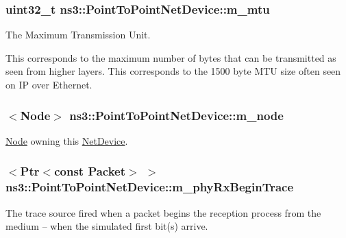 \subsubsection[{\texorpdfstring{m\+\_\+mtu}{m_mtu}}]{\setlength{\rightskip}{0pt plus 5cm}uint32\+\_\+t ns3\+::\+Point\+To\+Point\+Net\+Device\+::m\+\_\+mtu\hspace{0.3cm}{\ttfamily [private]}}\hypertarget{classns3_1_1PointToPointNetDevice_ae13b9dafe4a3bba937f53135df4f68ce}{}\label{classns3_1_1PointToPointNetDevice_ae13b9dafe4a3bba937f53135df4f68ce}


The Maximum Transmission Unit. 

This corresponds to the maximum number of bytes that can be transmitted as seen from higher layers. This corresponds to the 1500 byte M\+TU size often seen on IP over Ethernet. 
\subsubsection[{\texorpdfstring{m\+\_\+node}{m_node}}]{$<${\bf Node}$>$ ns3\+::\+Point\+To\+Point\+Net\+Device\+::m\+\_\+node\hspace{0.3cm}{\ttfamily [private]}}\hypertarget{classns3_1_1PointToPointNetDevice_ae3af5dcf609954c77f468d24286a3bf7}{}\label{classns3_1_1PointToPointNetDevice_ae3af5dcf609954c77f468d24286a3bf7}


\hyperlink{classns3_1_1Node}{Node} owning this \hyperlink{classns3_1_1NetDevice}{Net\+Device}. 

\subsubsection[{\texorpdfstring{m\+\_\+phy\+Rx\+Begin\+Trace}{m_phyRxBeginTrace}}]{$<${\bf Ptr}$<$const {\bf Packet}$>$ $>$ ns3\+::\+Point\+To\+Point\+Net\+Device\+::m\+\_\+phy\+Rx\+Begin\+Trace\hspace{0.3cm}{\ttfamily [private]}}\hypertarget{classns3_1_1PointToPointNetDevice_aca46a6ee3f8778f9cf13ddd55efc59fa}{}\label{classns3_1_1PointToPointNetDevice_aca46a6ee3f8778f9cf13ddd55efc59fa}
The trace source fired when a packet begins the reception process from the medium -- when the simulated first bit(s) arrive. 
